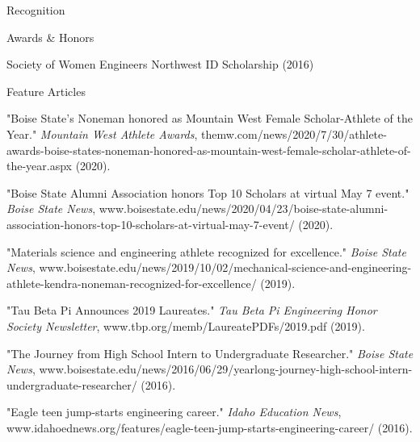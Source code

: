 \documentclass{resume} %
\begin{document}
\begin{rSection}{Recognition}
\begin{rSubsection2}{Awards \& Honors}{}{}{}
\item Society of Women Engineers Northwest ID Scholarship (2016)
\end{rSubsection2}
\begin{rSubsection3}{Feature Articles}{}{}{}
\item "Boise State's Noneman honored as Mountain West Female Scholar-Athlete of the Year." \textit{Mountain West Athlete Awards}, themw.com/news/2020/7/30/athlete-awards-boise-states-noneman-honored-as-mountain-west-female-scholar-athlete-of-the-year.aspx (2020).
\item "Boise State Alumni Association honors Top 10 Scholars at virtual May 7 event." \textit{Boise State News}, www.boisestate.edu/news/2020/04/23/boise-state-alumni-association-honors-top-10-scholars-at-virtual-may-7-event/ (2020).
\item "Materials science and engineering athlete recognized for excellence." \textit{Boise State News}, www.boisestate.edu/news/2019/10/02/mechanical-science-and-engineering-athlete-kendra-noneman-recognized-for-excellence/ (2019).
\item "Tau Beta Pi Announces 2019 Laureates." \textit{Tau Beta Pi Engineering Honor Society Newsletter}, www.tbp.org/memb/LaureatePDFs/2019.pdf (2019).
\item "The Journey from High School Intern to Undergraduate Researcher." \textit{Boise State News}, www.boisestate.edu/news/2016/06/29/yearlong-journey-high-school-intern-undergraduate-researcher/ (2016).
\item "Eagle teen jump-starts engineering career." \textit{Idaho Education News}, www.idahoednews.org/features/eagle-teen-jump-starts-engineering-career/ (2016).
\end{rSubsection3}
\end{rSection}
\newpage
\end{document}

